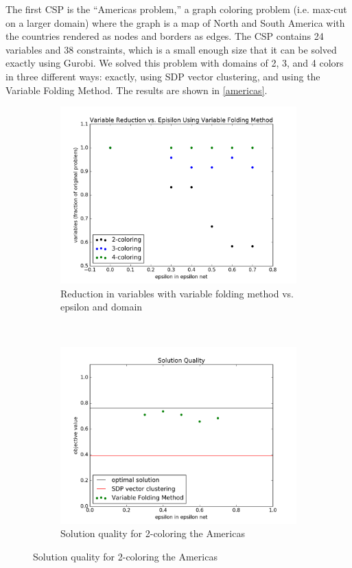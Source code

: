 \documentclass[12pt]{article} %
\begin{document}
The first CSP is the ``Americas problem,'' a graph coloring problem (i.e. max-cut on a larger domain) where the graph is a map of North and South America with the countries rendered as nodes and borders as edges. The CSP contains 24 variables and 38 constraints, which is a small enough size that it can be solved exactly using Gurobi. We solved this problem with domains of 2, 3, and 4 colors in three different ways: exactly, using SDP vector clustering, and using the Variable Folding Method. The results are shown in \autoref{americas}. 

\begin{figure}[ht!]
\centering
	\begin{subfigure}[b]{0.45\textwidth}
	\centering
	\includegraphics[width=\textwidth]{variables_epsilon_americas}
	\caption{Reduction in variables with variable folding method vs. epsilon and domain}
	\label{americas-reduction}
	\end{subfigure}
	~
	\begin{subfigure}[b]{0.45\textwidth}
	\centering
	\includegraphics[width=\textwidth]{solution_epsilon_2coloring}
	\caption{Solution quality for 2-coloring the Americas}
	\label{2-coloring}
	\end{subfigure}


\end{figure}
\end{document}

